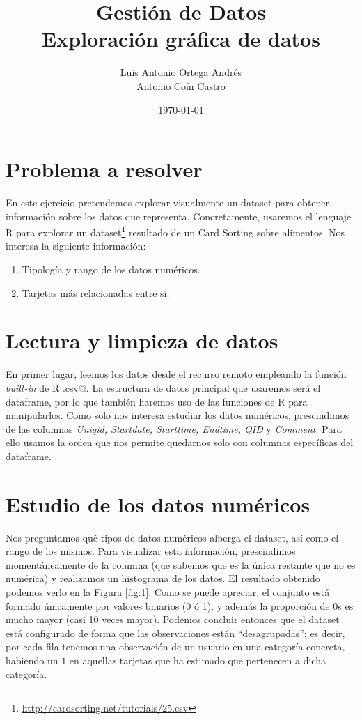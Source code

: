 \documentclass[11pt,a4paper]{article}
\title{Gestión de Datos\\ \Large{Exploración gráfica de datos} }
\author{Luis Antonio Ortega Andrés\\Antonio Coín Castro}
\date{\today}
\begin{document}
\maketitle

\section{Problema a resolver}
En este ejercicio pretendemos explorar visualmente un dataset para obtener información sobre los datos que representa. Concretamente, usaremos el lenguaje R para explorar un dataset\footnote{\href{http://cardsorting.net/tutorials/25.csv}{http://cardsorting.net/tutorials/25.csv}} resultado de un Card Sorting sobre alimentos. Nos interesa la siguiente información:

\begin{enumerate}
  \item Tipología y rango de los datos numéricos.
  \item Tarjetas más relacionadas entre sí.
\end{enumerate}

\section{Lectura y limpieza de datos}

En primer lugar, leemos los datos desde el recurso remoto empleando la función \textit{built-in} de R \verb@read.csv@. La estructura de datos principal que usaremos será el dataframe, por lo que también haremos uso de las funciones de R para manipularlos. Como solo nos interesa estudiar los datos numéricos, prescindimos de las columnas \textit{Uniqid, Startdate, Starttime, Endtime, QID} y \textit{Comment}. Para ello usamos la orden \verb@subset@ que nos permite quedarnos solo con columnas específicas del dataframe.

\section{Estudio de los datos numéricos}

Nos preguntamos qué tipos de datos numéricos alberga el dataset, así como el rango de los mismos. Para visualizar esta información, prescindimos momentáneamente de la columna \verb@Category@ (que sabemos que es la única restante que no es numérica) y realizamos un histograma de los datos. El resultado obtenido podemos verlo en la Figura \ref{fig:1}. Como se puede apreciar, el conjunto está formado únicamente por valores binarios (0 ó 1), y además la proporción de 0s es mucho mayor (casi 10 veces mayor). Podemos concluir entonces que el dataset está configurado de forma que las observaciones están ``desagrupadas''; es decir, por cada fila tenemos una observación de un usuario en una categoría concreta, habiendo un $1$ en aquellas tarjetas que ha estimado que pertenecen a dicha categoría.
\end{document}
